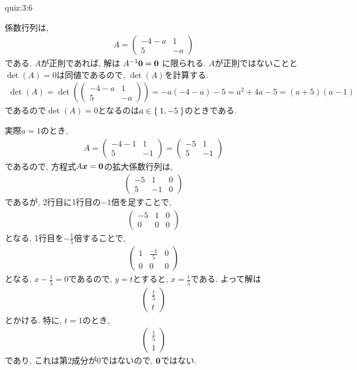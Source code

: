\begin{answerof}{quiz:3:6}
  
  係数行列は,
  \begin{align*}
    A=    \begin{pmatrix}-4-a&1\\5&-a\end{pmatrix}
  \end{align*}
  である.
  $A$が正則であれば,
  解は
  $A^{-1}\boldsymbol{0}=\boldsymbol{0}$
  に限られる.
  $A$が正則ではないことと$\det(A)=0$は同値であるので,
  $\det(A)$を計算する.
  \begin{align*}
    \det(A)=\det(\begin{pmatrix}-4-a&1\\5&-a\end{pmatrix})
     =-a(-4-a)-5=a^2+4a-5=(a+5)(a-1)
  \end{align*}
  であるので$\det(A)=0$となるのは$a\in\Set{1,-5}$のときである.

  実際$a=1$のとき,
  \begin{align*}
    A=\begin{pmatrix}-4-1&1\\5&-1\end{pmatrix}
    =\begin{pmatrix}-5&1\\5&-1\end{pmatrix}
  \end{align*}
  であるので, 方程式$A\boldsymbol{x}=\boldsymbol{0}$の拡大係数行列は,
  \begin{align*}
    \begin{pmatrix}-5&1&0\\5&-1&0\end{pmatrix}
  \end{align*}
  であるが, 2行目に1行目の$-1$倍を足すことで,
  \begin{align*}
    \begin{pmatrix}-5&1&0\\0&0&0\end{pmatrix}
  \end{align*}
  となる. 1行目を$-\frac{1}{5}$倍することで,
  \begin{align*}
    \begin{pmatrix}1&\frac{-1}{5}&0\\0&0&0\end{pmatrix}
  \end{align*}
  となる.  $x-\frac{1}{5}=0$であるので, $y=t$とすると, $x=\frac{t}{5}$である.
  よって解は
  \begin{align*}
    \begin{pmatrix}\frac{t}{5}\\t\end{pmatrix}
  \end{align*}
  とかける. 特に, $t=1$のとき,
  \begin{align*}
    \begin{pmatrix}\frac{1}{5}\\1\end{pmatrix}
  \end{align*}
  であり, これは第2成分が$0$ではないので, $\boldsymbol{0}$ではない.


\end{answerof}
